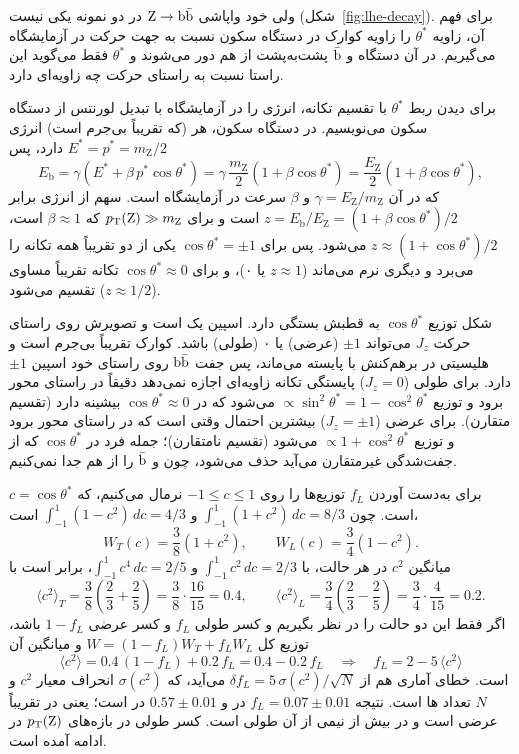 ولی خود واپاشی $\mathrm{Z}\to\mathrm{b}\bar{\mathrm{b}}$ در دو نمونه یکی نیست (شکل~\ref{fig:lhe-decay}). برای فهم آن، زاویه $\theta^*$ را زاویه کوارک \bq{} در دستگاه سکون \Zbos نسبت به جهت حرکت \Zbos در آزمایشگاه می‌گیریم. در آن دستگاه \bq{} و $\bar{\mathrm{b}}$ پشت‌به‌پشت از هم دور می‌شوند و $\theta^*$ فقط می‌گوید این راستا نسبت به راستای حرکت \Zbos چه زاویه‌ای دارد.

برای دیدن ربط $\theta^*$ با تقسیم تکانه، انرژی \bq{} را در آزمایشگاه با تبدیل لورنتس از دستگاه سکون \Zbos می‌نویسیم. در دستگاه سکون، هر \bq{} (که تقریباً بی‌جرم است) انرژی $E^*=p^*=m_\mathrm{Z}/2$ دارد، پس
\[
E_\mathrm{b}=\gamma\left(E^*+\beta\, p^*\cos\theta^*\right)=\gamma\,\frac{m_\mathrm{Z}}{2}\left(1+\beta\cos\theta^*\right)=\frac{E_\mathrm{Z}}{2}\left(1+\beta\cos\theta^*\right),
\]
که در آن $\gamma=E_\mathrm{Z}/m_\mathrm{Z}$ و $\beta$ سرعت \Zbos در آزمایشگاه است. سهم \bq{} از انرژی \Zbos برابر $z=E_\mathrm{b}/E_\mathrm{Z}=(1+\beta\cos\theta^*)/2$ است و برای $p_\mathrm{T}(\mathrm{Z})\gg m_\mathrm{Z}$ که $\beta\approx1$ است، $z\approx(1+\cos\theta^*)/2$ می‌شود. پس برای $\cos\theta^*=\pm1$ یکی از دو \bq{} تقریباً همه تکانه را می‌برد و دیگری نرم می‌ماند ($z\approx1$ یا ۰)، و برای $\cos\theta^*\approx0$ تکانه تقریباً مساوی تقسیم می‌شود ($z\approx1/2$).

شکل توزیع $\cos\theta^*$ به قطبش \Zbos بستگی دارد. اسپین \Zbos یک است و تصویرش روی راستای حرکت $J_z$ می‌تواند $\pm1$ (عرضی) یا ۰ (طولی) باشد. کوارک \bq{} تقریباً بی‌جرم است و هلیسیتی در برهم‌کنش با \Zbos پایسته می‌ماند، پس جفت $\mathrm{b}\bar{\mathrm{b}}$ روی راستای خود \bq{} اسپین $\pm1$ دارد. برای \Zbos طولی ($J_z=0$) پایستگی تکانه زاویه‌ای اجازه نمی‌دهد \bq{} دقیقاً در راستای محور برود و توزیع $\propto\sin^2\theta^*=1-\cos^2\theta^*$ می‌شود که در $\cos\theta^*\approx0$ بیشینه دارد (تقسیم متقارن). برای \Zbos عرضی ($J_z=\pm1$) بیشترین احتمال وقتی است که \bq{} در راستای محور برود و توزیع $\propto1+\cos^2\theta^*$ می‌شود (تقسیم نامتقارن)؛ جمله فرد در $\cos\theta^*$ که از جفت‌شدگی غیرمتقارن می‌آید حذف می‌شود، چون \bq{} و $\bar{\mathrm{b}}$ را از هم جدا نمی‌کنیم.

برای به‌دست آوردن $f_L$ توزیع‌ها را روی $-1\le c\le1$ نرمال می‌کنیم، که $c=\cos\theta^*$ است. چون $\int_{-1}^{1}(1+c^2)\,dc=8/3$ و $\int_{-1}^{1}(1-c^2)\,dc=4/3$ است،
\[
W_T(c)=\frac38\left(1+c^2\right),\qquad W_L(c)=\frac34\left(1-c^2\right).
\]
میانگین $c^2$ در هر حالت، با $\int_{-1}^{1}c^2\,dc=2/3$ و $\int_{-1}^{1}c^4\,dc=2/5$، برابر است با
\[
\langle c^2\rangle_T=\frac38\left(\frac23+\frac25\right)=\frac38\cdot\frac{16}{15}=0.4,\qquad
\langle c^2\rangle_L=\frac34\left(\frac23-\frac25\right)=\frac34\cdot\frac{4}{15}=0.2.
\]
اگر فقط این دو حالت را در نظر بگیریم و کسر طولی $f_L$ و کسر عرضی $1-f_L$ باشد، توزیع کل $W=(1-f_L)W_T+f_LW_L$ و میانگین آن
\[
\langle c^2\rangle=0.4\,(1-f_L)+0.2\,f_L=0.4-0.2\,f_L
\quad\Longrightarrow\quad
f_L=2-5\,\langle c^2\rangle
\]
است. خطای آماری هم از $\delta f_L=5\,\sigma(c^2)/\sqrt{N}$ می‌آید، که $\sigma(c^2)$ انحراف معیار $c^2$ و $N$ تعداد \Zbos ها است. نتیجه $f_L=0.07\pm0.01$ در \Zjet و $0.57\pm0.01$ در \ttZ است؛ یعنی \Zbos در \Zjet تقریباً عرضی است و در \ttZ بیش از نیمی از آن طولی است. کسر طولی در بازه‌های $p_\mathrm{T}(\mathrm{Z})$ در ادامه آمده است.

